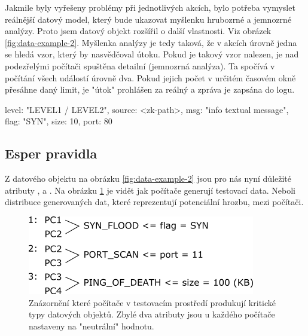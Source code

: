 \documentclass[
  digital, %
  table,   %
  nolof,     %
  nolot,     %
  oneside, %
  nocover,
  monochrome,
  12pt
]{fithesis3}
\begin{document}
Jakmile byly vyřešeny problémy při jednotlivých akcích, bylo potřeba vymyslet reálnější datový model, který bude ukazovat myšlenku hrubozrné a jemnozrné analýzy. Proto jsem datový objekt rozšířil o další vlastnosti. Viz obrázek \ref{fig:data-example-2}. Myšlenka analýzy je tedy taková, že v akcích úrovně jedna se hledá vzor, který by nasvědčoval útoku. Pokud je takový vzor nalezen, je nad podezřelými počítači spuštěna detailní (jemnozrná analýza). Ta spočívá v počítání všech událostí úrovně dva. Pokud jejich počet v určitém časovém okně přesáhne daný limit, je "útok" prohlášen za reálný a zpráva je zapsána do logu.

\begin{center}
\begin{minipage}[H]{.65\linewidth}
	\begin{mylisting}
{
	level: "LEVEL1 / LEVEL2",
	source: <zk-path>,
	msg: "info textual message",
	flag: "SYN",
	size: 10,
	port: 80
}
	\end{mylisting}
	\label{fig:data-example-2} 
\end{minipage}
\end{center}

\subsection*{Esper pravidla}
Z datového objektu na obrázku \ref{fig:data-example-2} jsou pro nás nyní důležité atributy ,  a . Na obrázku \ref{fig:pc-data-distribution} je vidět jak počítače generují testovací data. Neboli distribuce generovaných dat, které reprezentují potenciální hrozbu, mezi počítači.

\begin{figure}[H]
	\centering
    \includegraphics[width=.65\linewidth, height=.2\textheight]{images/pc-data-distribution.png}
    \caption{Znázornění které počítače v testovacím prostředí produkují kritické typy datových objektů. Zbylé dva atributy jsou u každého počítače nastaveny na "neutrální" hodnotu.}
    \label{fig:pc-data-distribution}
\end{figure}
\end{document}
